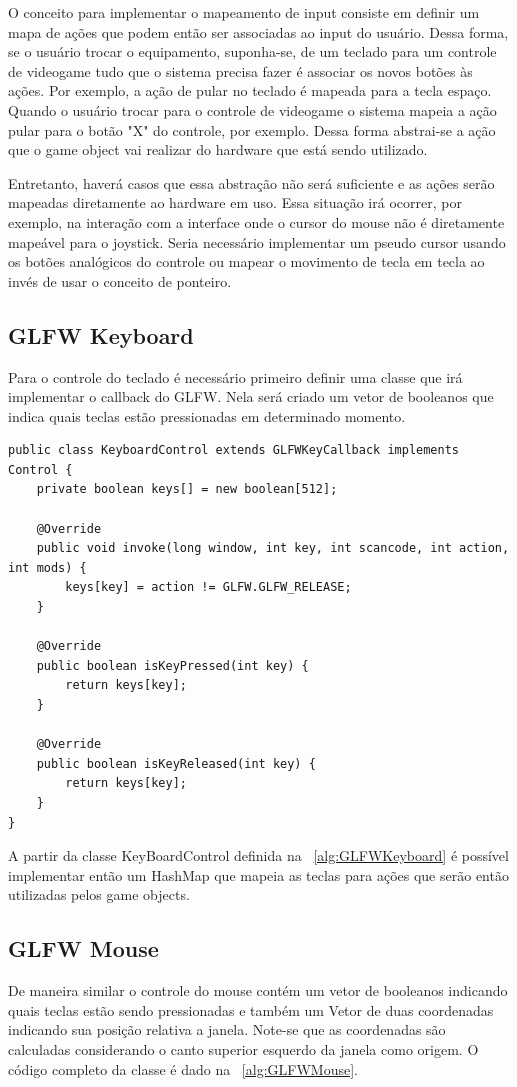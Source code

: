\documentclass[12pt, 
openright, 
oneside, 
a4paper,    
brazil]{facom-ufu-abntex2}
\begin{document}
O conceito para implementar o mapeamento de input consiste em definir um mapa de ações que podem então ser associadas ao input do usuário. Dessa forma, se o usuário trocar o equipamento, suponha-se, de um teclado para um controle de videogame tudo que o sistema precisa fazer é associar os novos botões às ações. Por exemplo, a ação de pular no teclado é mapeada para a tecla espaço. Quando o usuário trocar para o controle de videogame o sistema mapeia a ação pular para o botão "X" do controle, por exemplo. Dessa forma abstrai-se a ação que o game object vai realizar do hardware que está sendo utilizado.

Entretanto, haverá casos que essa abstração não será suficiente e as ações serão mapeadas diretamente ao hardware em uso. Essa situação irá ocorrer, por exemplo, na interação com a interface onde o cursor do mouse não é diretamente mapeável para o joystick. Seria necessário implementar um pseudo cursor usando os botões analógicos do controle ou mapear o movimento de tecla em tecla ao invés de usar o conceito de ponteiro.

\subsection{GLFW Keyboard}
Para o controle do teclado é necessário primeiro definir uma classe que irá implementar o callback do GLFW. Nela será criado um vetor de booleanos que indica quais teclas estão pressionadas em determinado momento.

\begin{lstlisting}[caption=Keyboard input, label={alg:GLFWKeyboard}]
public class KeyboardControl extends GLFWKeyCallback implements  Control {
    private boolean keys[] = new boolean[512];
 
    @Override
    public void invoke(long window, int key, int scancode, int action, int mods) {
        keys[key] = action != GLFW.GLFW_RELEASE;
    }
 
    @Override
    public boolean isKeyPressed(int key) {
        return keys[key];
    }
 
    @Override
    public boolean isKeyReleased(int key) {
        return keys[key];
    }
}
\end{lstlisting}

A partir da classe KeyBoardControl definida na \lstlistingname~\ref{alg:GLFWKeyboard} é possível implementar então um HashMap que mapeia as teclas para ações que serão então utilizadas pelos game objects.


\subsection{GLFW Mouse}
De maneira similar o controle do mouse contém um vetor de booleanos indicando quais teclas estão sendo pressionadas e também um Vetor de duas coordenadas indicando sua posição relativa a janela. Note-se que as coordenadas são calculadas considerando o canto superior esquerdo da janela como origem. O código completo da classe é dado na \lstlistingname~\ref{alg:GLFWMouse}.
\end{document}
